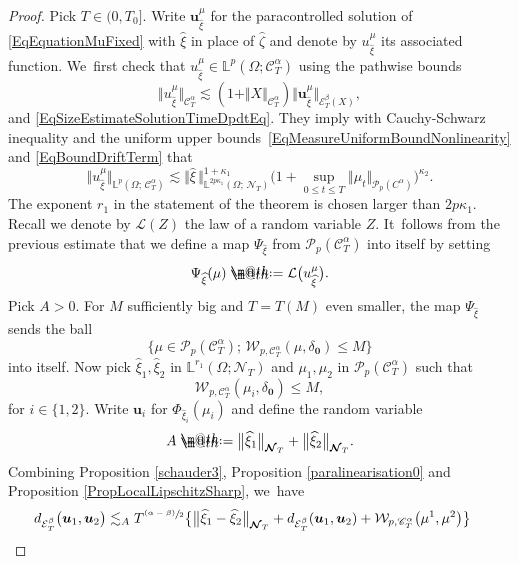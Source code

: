 \documentclass[JEP,XML,SOM,Unicode,published]{cedram}
\makeatletter
\newcommand{\psfrac}[2]{\sfrac{(#1)}{#2}}
\theoremstyle{definition}
\newcommand{\bfzero}{\mathbf{0}}
\newcommand{\mcE}{\mathcal{E}}
\newcommand{\mcL}{\mathcal{L}}
\newcommand{\mcN}{\mathcal{N}}
\newcommand{\mcP}{\mathcal{P}}
\newcommand\mcW{\mathcal W}
\newcommand{\bbL}{\mathbb{L}}
\newcommand{\bsu}{\boldsymbol{u}}
\newcommand{\scrC}{\ensuremath{\mathscr{C}}}
\newcommand*{\defeq}{\mathrel{\rlap{%
\raisebox{0.3ex}{$\m@th\cdot$}}%
\raisebox{-0.3ex}{$\m@th\cdot$}}%
=}
\newcommand{\dab}{\mcE^\beta_T}
\newcommand{\norme}[1]{\Vert #1 \Vert}
\makeatother
\begin{document}
\begin{proof}
Pick $T\in(0,T_0]$. Write $\bsu_{\widehat\xi}^{ \mu}$ for the paracontrolled solution of \eqref{EqEquationMuFixed} with $\widehat{\xi}$ in place of $\widehat{\zeta}$ and denote by $u^\mu_{\widehat\xi}$ its associated function. We~first check that $u^\mu_{\widehat\xi} \in \bbL^p(\Omega; \scrC^\alpha_T)$ using the pathwise bounds
\[
\norme{u^\mu_{\widehat\xi}}_{\scrC^\alpha_T} \lesssim (1+\norme{X}_{\scrC^\alpha_T})\norme{\bsu^\mu_{\widehat\xi}}_{\dab(X)},
\]
and \eqref{EqSizeEstimateSolutionTimeDpdtEq}. They imply with Cauchy-Schwarz inequality and the uniform upper bounds~\eqref{EqMeasureUniformBoundNonlinearity} and \eqref{EqBoundDriftTerm} that
\[
\Vert u^\mu_{\widehat\xi}\Vert_{\bbL^p(\Omega;\,\scrC^\alpha_T)}\lesssim \Vert \widehat{\xi} \, \Vert_{\bbL^{2p\kappa_1}(\Omega;\,{\boldsymbol{\mcN}}_T)}^{1+\kappa_1} \bigl(1+\sup_{0\leq t\leq T} \Vert \mu_t\Vert_{\mcP_p(C^\alpha)}\bigr)^{\kappa_2}.
\]
The exponent $r_1$ in the statement of the theorem is chosen larger than $2p\kappa_1$. Recall we denote by $\mcL(Z)$ the law of a random variable $Z$. It~follows from the previous estimate that we define a map $\Psi_{\widehat\xi}$ from $\mcP_p(\scrC^\alpha_T)$ into itself by setting
\[
\Psi_{\widehat\xi} (\mu) \defeq \mcL\bigl(u_{\widehat\xi}^{ \mu}\bigr).
\]
Pick $A>0$. For $M$ sufficiently big and $T=T(M)$ even smaller, the map $\Psi_{\widehat\xi}$ sends the ball
\[
\bigl\{ \mu \in \mcP_p(\scrC^\alpha_T);\, \mcW_{p,\scrC^\alpha_T}(\mu,\delta_\bfzero)\leq M\bigr\}
\]
into itself. Now pick $\widehat\xi_1, \widehat\xi_2$ in $\bbL^{r_1}(\Omega; {{\boldsymbol{\mcN}}_T})$ and $\mu_1, \mu_2$ in $\mcP_p(\scrC^\alpha_T)$ such that
\begin{equation} \label{EqBallCondition}
\mcW_{p,\scrC^\alpha_T}(\mu_i, \delta_\bfzero) \leq M,
\end{equation}
for $i\in\{1,2\}$. Write $\bsu_i$ for $\Phi_{\widehat\xi_i}(\mu_i)$ and define the random variable
\[
A \defeq \big\Vert \widehat\xi_1\big\Vert_{{{\boldsymbol{\mcN}}_T}} + \big\Vert \widehat\xi_2\big\Vert_{{{\boldsymbol{\mcN}}_T}}.
\]
Combining Proposition \ref{schauder3}, Proposition \ref{paralinearisation0} and Proposition \ref{PropLocalLipschitzSharp}, we~have
\begin{equation*} \begin{split}
d_{\mcE_T^\beta} \bigl(\bsu_1, \bsu_2\bigr) &\lesssim_A T^{\psfrac{\alpha-\beta}{2}} \bigl\{ \big\Vert \widehat\xi_1 - \widehat\xi_2\big\Vert_{{{\boldsymbol{\mcN}}_T}} + d_{\mcE^\beta_T}(\bsu_1, \bsu_2) + \mcW_{p,\scrC^\alpha_T}{\bigl({\mu}^1, {\mu}^2\bigr)} \bigr\}

\end{split}
\end{equation*}
\end{proof}
\end{document}

